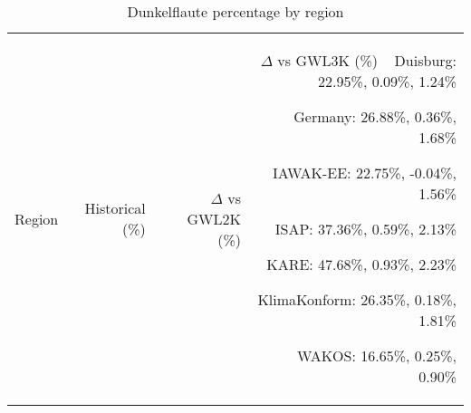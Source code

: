 \begin{table}[!htbp]
\centering
\caption{Dunkelflaute percentage by region}
\label{Table:Dunkelflaute_regions}
\begin{tabular}{lrrr}
\hline
Region & Historical (\%) & $\Delta$ vs GWL2K (\%) & $\Delta$ vs GWL3K (\%) \
\hline
Duisburg: 22.95\%, 0.09\%, 1.24\%

Germany: 26.88\%, 0.36\%, 1.68\%

IAWAK-EE: 22.75\%, -0.04\%, 1.56\%

ISAP: 37.36\%, 0.59\%, 2.13\%

KARE: 47.68\%, 0.93\%, 2.23\%

KlimaKonform: 26.35\%, 0.18\%, 1.81\%

WAKOS: 16.65\%, 0.25\%, 0.90\%

\bottomrule
\end{tabular}
\end{table}
